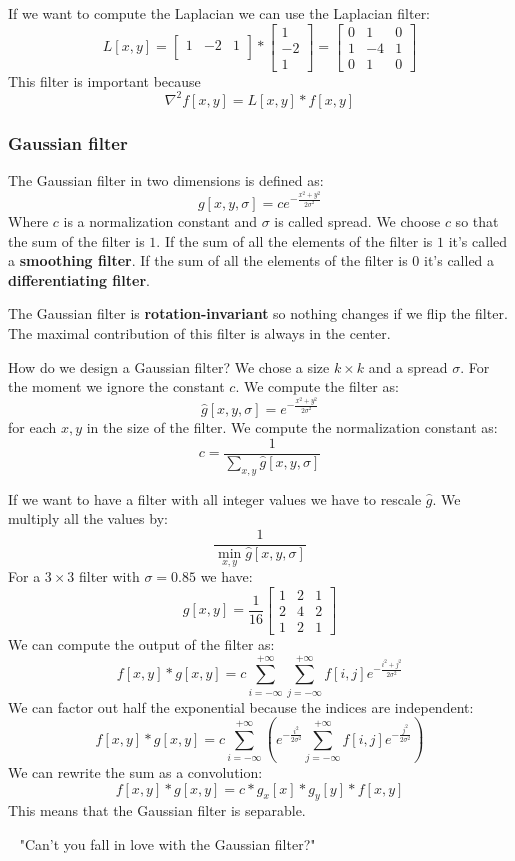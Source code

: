 If we want to compute the Laplacian we can use the Laplacian filter:
\[
    L[x,y]=\begin{bmatrix}
        1 & -2 & 1 \\
    \end{bmatrix} * \begin{bmatrix}
        1 \\
        -2 \\
        1
    \end{bmatrix} = \begin{bmatrix}
        0 & 1 & 0 \\
        1 & -4 & 1 \\
        0 & 1 & 0
    \end{bmatrix}
\]
This filter is important because
\[
    \nabla^2 f[x,y]=L[x,y]*f[x,y]
\]

\subsubsection{Gaussian filter}
\label{sec:gaussian_filter}

The Gaussian filter in two dimensions is defined as:
\[
    g[x,y,\sigma]=ce^{-\frac{x^2+y^2}{2\sigma^2}}
\]
Where $c$ is a normalization constant and $\sigma$ is called spread.
We choose $c$ so that the sum of the filter is $1$.
If the sum of all the elements of the filter is $1$ it's called a \textbf{smoothing filter}.
If the sum of all the elements of the filter is $0$ it's called a \textbf{differentiating filter}.

The Gaussian filter is \textbf{rotation-invariant} so nothing changes if we flip the filter.
The maximal contribution of this filter is always in the center.

How do we design a Gaussian filter?
We chose a size $k\times k$ and a spread $\sigma$.
For the moment we ignore the constant $c$.
We compute the filter as:
\[
    \hat{g}[x,y,\sigma]=e^{-\frac{x^2+y^2}{2\sigma^2}}
\]
for each $x,y$ in the size of the filter.
We compute the normalization constant as:
\[
    c=\frac{1}{\sum_{x,y}\hat{g}[x,y,\sigma]}
\]

If we want to have a filter with all integer values we have to rescale $\hat{g}$.
We multiply all the values by:
\[
    \frac{1}{\min_{x,y}\hat{g}[x,y,\sigma]}
\]
For a $3\times 3$ filter with $\sigma=0.85$ we have:
\[
    g[x,y]=\frac{1}{16}\begin{bmatrix}
        1 & 2 & 1 \\
        2 & 4 & 2 \\
        1 & 2 & 1
    \end{bmatrix}
\]
We can compute the output of the filter as:
\[
    f[x,y]*g[x,y]=
    c\sum_{i=-\infty}^{+\infty}\sum_{j=-\infty}^{+\infty}f[i,j]
    e^{-\frac{i^2+j^2}{2\sigma^2}}
\]
We can factor out half the exponential because the indices are independent:
\[
    f[x,y]*g[x,y]=
    c\sum_{i=-\infty}^{+\infty}(e^{-\frac{i^2}{2\sigma^2}}\sum_{j=-\infty}^{+\infty}f[i,j]e^{-\frac{j^2}{2\sigma^2}})
\]
We can rewrite the sum as a convolution:
\[
    f[x,y]*g[x,y]=
    c*g_x[x]*g_y[y]*f[x,y]
\]
This means that the Gaussian filter is separable.

~ "Can't you fall in love with the Gaussian filter?"
